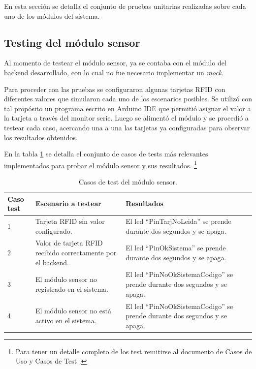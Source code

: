 En esta sección se detalla el conjunto de pruebas unitarias realizadas sobre cada uno de los módulos del sistema.

\subsection{Testing del módulo sensor}

Al momento de testear el módulo sensor, ya se contaba con el módulo del backend desarrollado, con lo cual no fue necesario implementar un \textit{mock}.

Para proceder con las pruebas se configuraron algunas tarjetas RFID con diferentes valores que simularon cada uno de los escenarios posibles. Se utilizó con tal propósito un programa escrito en Arduino IDE que permitió asignar el valor a la tarjeta a través del monitor serie. Luego se alimentó el módulo y se procedió a testear cada caso, acercando una a una las tarjetas ya configuradas para observar los resultados obtenidos.

En la tabla \ref{tab:tablaTestNodSensor} se detalla el conjunto de casos de tests más relevantes implementados para probar el módulo sensor y sus resultados. \footnote{Para tener un detalle completo de los test remitirse al documento de Casos de Uso y Casos de Test \citep{WEBSITE:CasosUsoYTest}.}

\begin{table}[h]
	\centering
	\caption[Tipos de pruebas sensor]{Casos de test del módulo sensor.}
	\begin{tabular}{p{1.5cm} p{5.5cm} p{5.5cm}} 	

		\toprule
		\textbf{Caso test} & 
		\textbf{Escenario a testear} & 
		\textbf{Resultados} 
		\\
		\midrule
1 & Tarjeta RFID sin valor configurado. & El led ``PinTarjNoLeida'' se prende durante dos segundos y se apaga. \\
2 & Valor de tarjeta RFID recibido correctamente por el backend.	& El led ``PinOkSistema'' se prende durante dos segundos y se apaga. \\
3 & El módulo sensor no registrado en el sistema. & El led ``PinNoOkSistemaCodigo'' se prende durante dos segundos y se apaga. \\
4 & El módulo sensor no está activo en el sistema. & El led ``PinNoOkSistemaCodigo'' se prende durante dos segundos y se apaga. \\	   
		\bottomrule
		\hline
	\end{tabular}
	\label{tab:tablaTestNodSensor}
\end{table}

